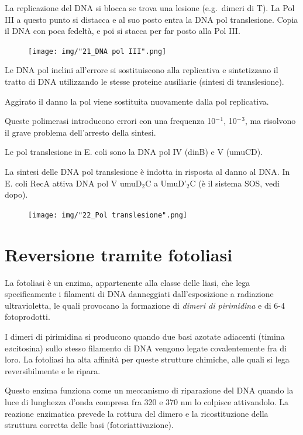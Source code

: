 \documentclass[11pt]{book}
\begin{document}
La replicazione del DNA si blocca se trova una lesione (e.g.~dimeri di
T). La Pol III a questo punto si distacca e al suo posto entra la DNA
pol translesione. Copia il DNA con poca fedeltà, e poi si stacca per far
posto alla Pol III.

\begin{figure}[htp]
\centering
\texttt{[image: img/"21\_DNA pol III".png]}
\caption{}
\label{dna-pol-iii}
\end{figure}

\clearpage
Le DNA pol inclini all'errore si sostituiscono alla replicativa e
sintetizzano il tratto di DNA utilizzando le stesse proteine ausiliarie
(sintesi di translesione).

Aggirato il danno la pol viene sostituita nuovamente dalla pol
replicativa.

Queste polimerasi introducono errori con una frequenza 10\(^-\)\(^1\),
10\(^-\)\(^3\), ma risolvono il grave problema dell'arresto della
sintesi.

Le pol translesione in E. coli sono la DNA pol IV (dinB) e V (umuCD).

La sintesi delle DNA pol translesione è indotta in risposta al danno al
DNA. In E. coli RecA attiva DNA pol V umuD\(_2\)C a UmuD'\(_2\)C (è il
sistema SOS, vedi dopo).

\begin{figure}[htp]
\centering
\texttt{[image: img/"22\_Pol translesione".png]}
\caption{}
\label{pol-translesione}
\end{figure}

\section{Reversione tramite
fotoliasi}\label{reversione-tramite-fotoliasi}

La fotoliasi è un enzima, appartenente alla classe delle liasi, che lega
specificamente i filamenti di DNA danneggiati dall'esposizione a
radiazione ultravioletta, le quali provocano la formazione di
\emph{dimeri di pirimidina} e di 6-4 fotoprodotti.

I dimeri di pirimidina si producono quando due basi azotate adiacenti
(timina e\o citosina) sullo stesso filamento di DNA vengono legate
covalentemente fra di loro. La fotoliasi ha alta affinità per queste
strutture chimiche, alle quali si lega reversibilmente e le ripara.

Questo enzima funziona come un meccanismo di riparazione del DNA quando
la luce di lunghezza d'onda compresa fra 320 e 370 nm lo colpisce
attivandolo. La reazione enzimatica prevede la rottura del dimero e la
ricostituzione della struttura corretta delle basi (fotoriattivazione).
\end{document}
